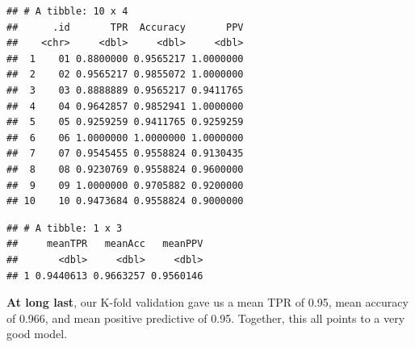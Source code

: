 \documentclass[]{article}
\newenvironment{Shaded}{\begin{snugshade}}{\end{snugshade}}
\newcommand{\KeywordTok}[1]{\textcolor[rgb]{0.13,0.29,0.53}{\textbf{#1}}}
\newcommand{\DataTypeTok}[1]{\textcolor[rgb]{0.13,0.29,0.53}{#1}}
\newcommand{\StringTok}[1]{\textcolor[rgb]{0.31,0.60,0.02}{#1}}
\newcommand{\OperatorTok}[1]{\textcolor[rgb]{0.81,0.36,0.00}{\textbf{#1}}}
\newcommand{\NormalTok}[1]{#1}
\begin{document}
\begin{verbatim}
## # A tibble: 10 x 4
##      .id       TPR  Accuracy       PPV
##    <chr>     <dbl>     <dbl>     <dbl>
##  1    01 0.8800000 0.9565217 1.0000000
##  2    02 0.9565217 0.9855072 1.0000000
##  3    03 0.8888889 0.9565217 0.9411765
##  4    04 0.9642857 0.9852941 1.0000000
##  5    05 0.9259259 0.9411765 0.9259259
##  6    06 1.0000000 1.0000000 1.0000000
##  7    07 0.9545455 0.9558824 0.9130435
##  8    08 0.9230769 0.9558824 0.9600000
##  9    09 1.0000000 0.9705882 0.9200000
## 10    10 0.9473684 0.9558824 0.9000000
\end{verbatim}

\begin{Shaded}
\end{Shaded}

\begin{verbatim}
## # A tibble: 1 x 3
##     meanTPR   meanAcc   meanPPV
##       <dbl>     <dbl>     <dbl>
## 1 0.9440613 0.9663257 0.9560146
\end{verbatim}

\textbf{At long last}, our K-fold validation gave us a mean TPR of 0.95,
mean accuracy of 0.966, and mean positive predictive of 0.95. Together,
this all points to a very good model.
\end{document}
